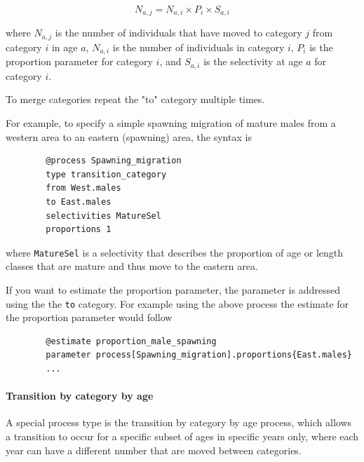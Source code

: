 \begin{equation}
	N_{a,j} = N_{a,i} \times P_i \times S_{a,i}
\end{equation}

where $N_{a,j}$ is the number of individuals that have moved to category $j$ from category $i$ in age $a$, $N_{a,i}$ is the number of individuals in category $i$, $P_i$ is the proportion parameter for category $i$, and $S_{a,i}$ is the selectivity at age $a$ for category $i$.

To merge categories repeat the "to" category multiple times.

For example, to specify a simple spawning migration of mature males from a western area to an eastern (spawning) area, the syntax is

{\small{\begin{verbatim}
		@process Spawning_migration
		type transition_category
		from West.males
		to East.males
		selectivities MatureSel
		proportions 1
		\end{verbatim}}}

where \texttt{MatureSel} is a selectivity that describes the proportion of age or length classes that are mature and thus move to the eastern area.

If you want to estimate the proportion parameter, the parameter is addressed using the the \texttt{to} category. For example using the above process the estimate for the proportion parameter would follow

{\small{\begin{verbatim}
		@estimate proportion_male_spawning
		parameter process[Spawning_migration].proportions{East.males}
		...
\end{verbatim}}}

\paragraph{Transition by category by age}\label{sec:Process-TransitionCategoryByAge}

A special process type is the transition by category by age process, which allows a transition to occur for a specific subset of ages in specific years only, where each year can have a different number that are moved between categories.

\subsubsection{}\label{sec:Process-TagByAge}\label{sec:Process-TagByLength} 

